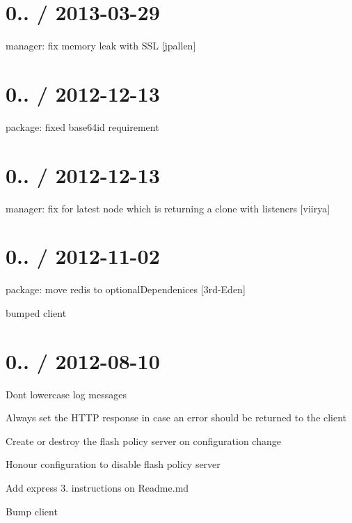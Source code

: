 \section*{0.. / 2013-\/03-\/29 }


\begin{DoxyItemize}
\item manager\+: fix memory leak with S\+SL \mbox{[}jpallen\mbox{]}
\end{DoxyItemize}

\section*{0.. / 2012-\/12-\/13 }


\begin{DoxyItemize}
\item package\+: fixed {\ttfamily base64id} requirement
\end{DoxyItemize}

\section*{0.. / 2012-\/12-\/13 }


\begin{DoxyItemize}
\item manager\+: fix for latest node which is returning a clone with {\ttfamily listeners} \mbox{[}viirya\mbox{]}
\end{DoxyItemize}

\section*{0.. / 2012-\/11-\/02 }


\begin{DoxyItemize}
\item package\+: move redis to optional\+Dependenices \mbox{[}3rd-\/\+Eden\mbox{]}
\item bumped client
\end{DoxyItemize}

\section*{0.. / 2012-\/08-\/10 }


\begin{DoxyItemize}
\item Don\textquotesingle{}t lowercase log messages
\item Always set the H\+T\+TP response in case an error should be returned to the client
\item Create or destroy the flash policy server on configuration change
\item Honour configuration to disable flash policy server
\item Add express 3. instructions on Readme.\+md
\item Bump client
\end{DoxyItemize}

